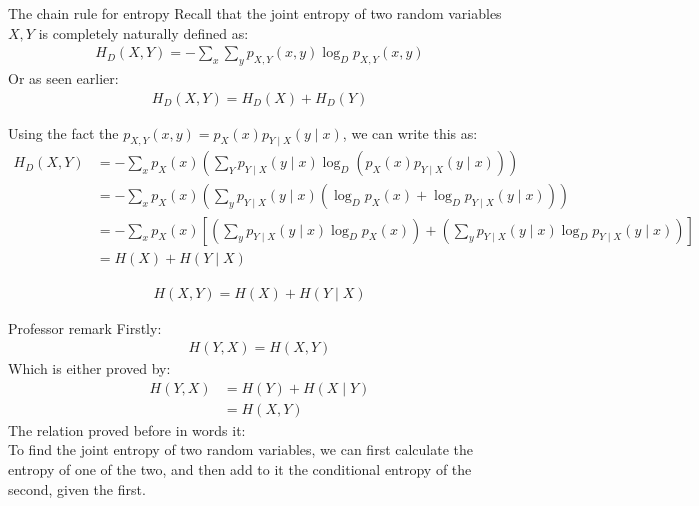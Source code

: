 \begin{parag}{The chain rule for entropy}
    Recall that the joint entropy of two random variables $X, Y$ is completely naturally defined as:
    \begin{align*}
        H_D(X, Y) = - \sum_x \sum_y p_{X, Y}(x, y) \log_Dp_{X, Y}(x, y)
    \end{align*}
    Or as seen earlier:
    \begin{align*}
        H_D(X, Y) = H_D(X) + H_D(Y)
    \end{align*}
    
    Using the fact the $p_{X, Y}(x, y) = p_X(x)p_{Y \mid  X} ( y \mid  x)$, we can write this as:
    \begin{align*}
        H_D(X, Y) &= - \sum_x p_X(x) \left( \sum_Y p_{Y \mid  X}( y \mid  x) \log_D(p_X(x)p_{Y \mid  X}(y \mid  x)) \right) \\
                  &= - \sum_x p_X(x) \left( \sum_yp_{Y \mid  X}(y \mid  x) (\log_D p_X(x) + \log_Dp_{Y \mid  X}(y \mid x)) \right) \\
                  &= - \sum_x p_X(x) \left[ \left( \sum_y p_{Y \mid  X} (y \mid x) \log_D p_X(x) \right) + \left( \sum_y p_{Y \mid  X} (y \mid  x) \log_D p_{Y \mid  X}(y \mid  x) \right) \right] \\
                  &= H(X) + H(Y \mid  X)
    \end{align*}
    
    \begin{theoreme}
        \begin{align*}
            H(X, Y) = H(X) + H(Y \mid  X)
        \end{align*}
    \end{theoreme}
    \begin{subparag}{Professor remark}
        Firstly:
        \begin{align*}
            H(Y, X) = H(X, Y)
        \end{align*}
        Which is either proved by:
        \begin{align*}
            H(Y,X ) &= H(Y) + H(X \mid  Y) \\
                &= H(X, Y)
        \end{align*}
        The relation proved before in words it:
       \\
       To find the joint entropy of two random variables, we can first calculate the entropy of one of the two, and then add to it the conditional entropy of the second, given the first.
    \end{subparag}
\end{parag}

